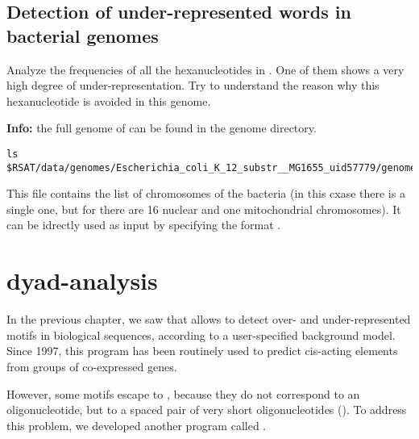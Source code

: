 \subsection{Detection of under-represented words in bacterial genomes}

\begin{exercise}

  Analyze the frequencies of all the hexanucleotides in
  . One of them shows a very high degree of
  under-representation. Try to understand the reason why this
  hexanucleotide is avoided in this genome.

  \textbf{Info:} the full genome of  can be
  found in the \RSAT genome directory.

{\color{Blue} \begin{footnotesize} 
\begin{verbatim}
ls $RSAT/data/genomes/Escherichia_coli_K_12_substr__MG1655_uid57779/genome/contigs.txt
\end{verbatim} \end{footnotesize}
}

This file contains the list of chromosomes of the bacteria (in this
cxase there is a single one, but for  there are 16 nuclear
and one mitochondrial chromosomes). It can be idrectly used as input
by specifying the format .
\end{exercise}


\section{dyad-analysis}

In the previous chapter, we saw that  allows
to detect over- and under-represented motifs in biological sequences,
according to a user-specified background model. Since 1997, this
program has been routinely used to predict cis-acting elements from
groups of co-expressed genes.

However, some motifs escape to , because they
do not correspond to an oligonucleotide, but to a spaced pair of very
short oligonucleotides (). To address this problem, we
developed another program called .

\tbw




